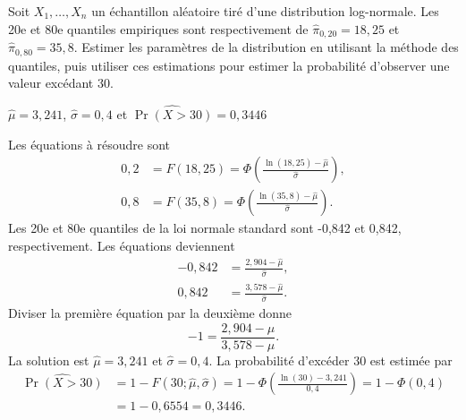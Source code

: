 \begin{exercice}
Soit $X_1, \dots, X_n$ un échantillon aléatoire tiré d'une distribution log-normale. Les 20e et 80e quantiles empiriques sont respectivement de $\hat{\pi}_{0,20} = 18,25$ et $\hat{\pi}_{0,80} = 35,8$. Estimer les paramètres de la distribution en utilisant la méthode des quantiles, puis utiliser ces estimations pour estimer la probabilité d'observer une valeur excédant 30.

\begin{rep}
$\hat{\mu}=3,241$, $\hat{\sigma}=0,4$ et $\widehat{\Pr(X>30)}= 0,3446$
\end{rep}

\begin{sol}
Les équations à résoudre sont
\begin{align*}
0,2 &= F(18,25) = \Phi\left(\frac{\ln(18,25)-\hat{\mu}}{\hat{\sigma}}\right), \\
0,8 &= F(35,8) = \Phi\left(\frac{\ln(35,8)-\hat{\mu}}{\hat{\sigma}}\right).
\end{align*}
Les 20e et 80e quantiles de la loi normale standard sont -0,842 et 0,842, respectivement. Les équations deviennent
\begin{align*}
-0,842 &= \frac{2,904-\hat{\mu}}{\hat{\sigma}}, \\
0,842 &= \frac{3,578-\hat{\mu}}{\hat{\sigma}}.
\end{align*}
Diviser la première équation par la deuxième donne
$$
-1 = \frac{2,904-\hat{\mu}}{3,578-\hat{\mu}}.
$$
La solution est $\hat{\mu}=3,241$ et $\hat{\sigma}=0,4$. La probabilité d'excéder 30 est estimée par
\begin{align*}
\widehat{\Pr(X>30)} &= 1-F(30; \hat\mu,\hat\sigma) = 1-\Phi\left(\frac{\ln(30)-3,241}{0,4}\right) = 1-\Phi(0,4) \\
&= 1-0,6554 = 0,3446.
\end{align*}
\end{sol}
\end{exercice}

